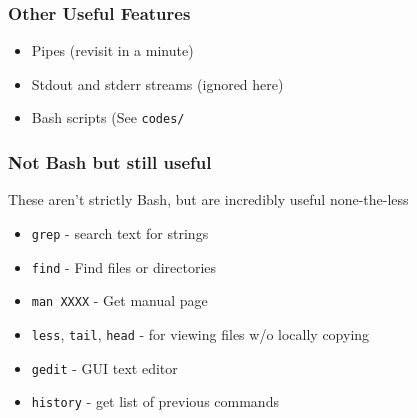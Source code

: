 \documentclass{beamer}
\newcommand{\code}[1]{\colorbox{codegray}{\texttt{#1}}}
\begin{document}



\begin{frame}
\frametitle{Other Useful Features}
\begin{itemize}
    \item Pipes (revisit in a minute)
    \pause
    \item Stdout and stderr streams (ignored here)
    \pause
    \item Bash scripts (See \code{codes/}
    \pause
\end{itemize}
\end{frame}






\begin{frame}
\frametitle{Not Bash but still useful}
These aren't strictly Bash, but are incredibly useful none-the-less
\begin{itemize}
    \item \code{grep} - search text for strings
    \pause
    \item \code{find}   - Find files or directories
    \pause
    \item \code{man XXXX} - Get manual page
    \pause
    \item \code{less}, \code{tail}, \code{head} - for viewing files w/o locally copying
    \pause
    \item \code{gedit} - GUI text editor
    \pause
    \item \code{history} - get list of previous commands
    \pause
\end{itemize}
\end{frame}
\end{document}
